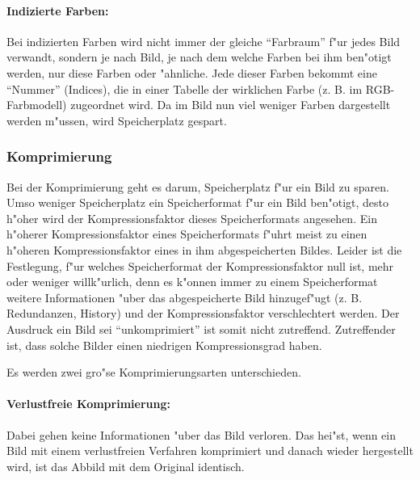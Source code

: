  
\paragraph{Indizierte Farben:}

Bei indizierten Farben wird nicht immer der gleiche ``Farb\-raum'' f"ur jedes Bild verwandt, sondern je nach Bild, je nach dem welche Farben bei ihm ben"otigt werden, nur diese Farben oder "ahnliche. Jede dieser Farben bekommt eine ``Nummer'' (Indices), die in einer Tabelle der wirklichen Farbe (z. B. im RGB-Farbmodell) zugeordnet wird. Da im Bild nun viel weniger Farben dargestellt werden m"ussen, wird Speicherplatz gespart. 

\subsubsection{Komprimierung}

Bei der Komprimierung geht es darum, Speicherplatz f"ur ein Bild zu sparen. Umso weniger Speicherplatz ein Speicherformat f"ur ein Bild ben"otigt, desto h"oher wird der Kompressionsfaktor dieses Speicherformats angesehen. Ein h"oherer Kompressionsfaktor eines Speicherformats f"uhrt meist zu einen h"oheren Kompressionsfaktor eines in ihm abgespeicherten Bildes. Leider ist die Festlegung, f"ur welches Speicherformat der Kompressionsfaktor null ist, mehr oder weniger willk"urlich, denn es k"onnen immer zu einem Speicherformat weitere Informationen "uber das abgespeicherte Bild hinzugef"ugt (z. B. Redundanzen, History) und der Kompressionsfaktor verschlechtert werden.
Der Ausdruck ein Bild sei ``unkomprimiert'' ist somit nicht zutreffend. Zutreffender ist, dass solche Bilder einen niedrigen Kompressionsgrad haben.

\bigskip\noindent
Es werden zwei gro"se Komprimierungsarten unterschieden.

\paragraph{Verlustfreie Komprimierung:}

Dabei gehen keine Informationen "uber das Bild verloren. Das hei"st, wenn ein Bild mit einem verlustfreien Verfahren komprimiert und danach wieder hergestellt wird, ist das Abbild mit dem Original identisch.

